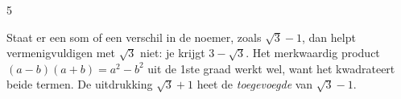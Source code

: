 \begin{oefeningen}
\end{oefeningen}
\begin{alleenvoor}{5}

Staat er een som of een verschil in de noemer, zoals $\sqrt3 - 1$, dan helpt vermenigvuldigen met $\sqrt3$ niet: je krijgt $3 - \sqrt3$. Het merkwaardig product $(a - b)(a + b) = a^2 - b^2$ uit de 1ste graad werkt wel, want het kwadrateert beide termen. De uitdrukking $\sqrt3 + 1$ heet de \textit{toegevoegde} van $\sqrt3 - 1$.

\end{alleenvoor}

